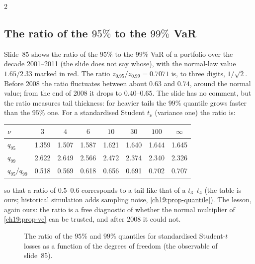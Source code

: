 \begin{paracol}{2}
\subsection{The ratio of the $95\%$ to the $99\%$ VaR}
Slide~85 shows the ratio of the $95\%$ to the $99\%$ VaR of a portfolio over the decade 2001--2011 (the slide does not say whose), with the normal-law value $1.65/2.33$ marked in red. The ratio $z_{0.95}/z_{0.99}=0.7071$ is, to three digits, $1/\sqrt2$. Before 2008 the ratio fluctuates between about $0.63$ and $0.74$, around the normal value; from the end of 2008 it drops to $0.40$--$0.65$. The slide has no comment, but the ratio measures tail thickness: for heavier tails the $99\%$ quantile grows faster than the $95\%$ one. For a standardised Student $t_\nu$ (variance one) the ratio is:
\begin{center}\small
\begin{tabular}{@{}lccccccc@{}}
\toprule
$\nu$ & $3$ & $4$ & $6$ & $10$ & $30$ & $100$ & $\infty$\\
\midrule
$q_{95}$ & 1.359 & 1.507 & 1.587 & 1.621 & 1.640 & 1.644 & 1.645\\
$q_{99}$ & 2.622 & 2.649 & 2.566 & 2.472 & 2.374 & 2.340 & 2.326\\
$q_{95}/q_{99}$ & 0.518 & 0.569 & 0.618 & 0.656 & 0.691 & 0.702 & 0.707\\
\bottomrule
\end{tabular}
\end{center}
so that a ratio of $0.5$--$0.6$ corresponds to a tail like that of a $t_3$--$t_4$ (the table is ours; historical simulation adds sampling noise, \cref{ch19:prop-quantile}). The lesson, again ours: the ratio is a free diagnostic of whether the normal multiplier of \cref{ch19:prop-vc} can be trusted, and after 2008 it could not.

\begin{figure}[ht]
\centering
{}
\caption{The ratio of the $95\%$ and $99\%$ quantiles for standardised Student-$t$ losses as a function of the degrees of freedom (the observable of slide~85).}\label{ch19:fig-ratio}
\end{figure}


\end{paracol}
